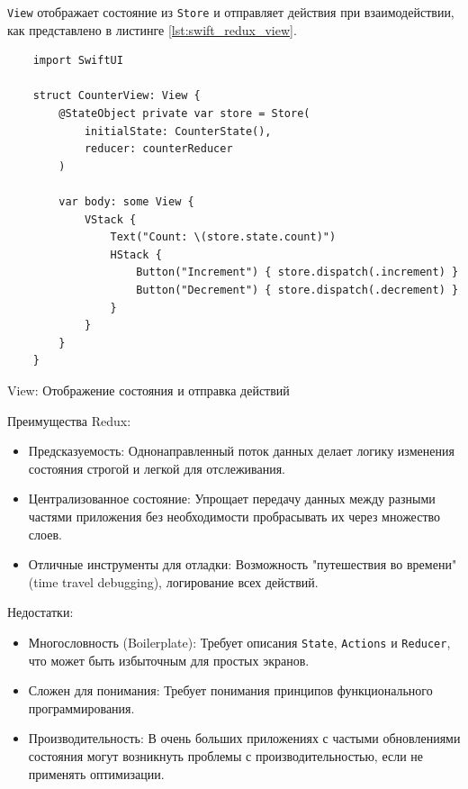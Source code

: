 \documentclass[14pt, russian]{scrartcl}
\begin{document}
\begin{enumerate}
    \texttt{View} отображает состояние из \texttt{Store} и отправляет действия при взаимодействии, как представлено в листинге \ref{lst:swift_redux_view}.

    \begin{listing}[H]
    \begin{verbatim}
    import SwiftUI

    struct CounterView: View {
        @StateObject private var store = Store(
            initialState: CounterState(),
            reducer: counterReducer
        )

        var body: some View {
            VStack {
                Text("Count: \(store.state.count)")
                HStack {
                    Button("Increment") { store.dispatch(.increment) }
                    Button("Decrement") { store.dispatch(.decrement) }
                }
            }
        }
    }
    \end{verbatim}
    \caption{View: Отображение состояния и отправка действий}
    \label{lst:swift_redux_view}
    \end{listing}
\end{enumerate}

Преимущества Redux:
\begin{itemize}
    \item Предсказуемость: Однонаправленный поток данных делает логику изменения состояния строгой и легкой для отслеживания.
    \item Централизованное состояние: Упрощает передачу данных между разными частями приложения без необходимости пробрасывать их через множество слоев.
    \item Отличные инструменты для отладки: Возможность "путешествия во времени" (time travel debugging), логирование всех действий.
\end{itemize}

Недостатки:
\begin{itemize}
    \item Многословность (Boilerplate): Требует описания \texttt{State}, \texttt{Actions} и \texttt{Reducer}, что может быть избыточным для простых экранов.
    \item Сложен для понимания: Требует понимания принципов функционального программирования.
    \item Производительность: В очень больших приложениях с частыми обновлениями состояния могут возникнуть проблемы с производительностью, если не применять оптимизации.
\end{itemize}
\end{document}
